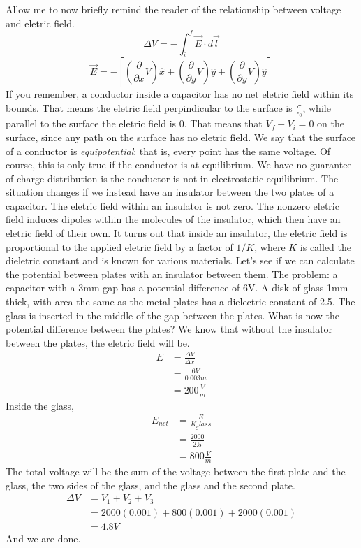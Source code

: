 \documentclass[nobib]{tufte-handout}
\begin{document}
Allow me to now briefly remind the reader of 
the relationship between voltage and eletric field. 
\[\Delta V = -\int_{i}^{f} \vec{E}\cdot d\vec{l}\]
\[\vec{E} = - \left[ \left(\frac{\partial}{\partial x}V\right)\hat{x} + \left(\frac{\partial}{\partial y}V\right)\hat{y} + \left(\frac{\partial}{\partial y}V\right)\hat{y} \right]\]
If you remember, a conductor inside a capacitor
has no net eletric field within its bounds. 
That means the eletric field perpindicular to 
the surface is $\frac{\sigma}{\epsilon_0}$, while parallel 
to the surface the eletric field is 0. 
That means that $V_f - V_i = 0$ on 
the surface, since any path on the surface has 
no eletric field. We say that the surface of 
a conductor is \emph{equipotential}; that is, 
every point has the same voltage. Of course, this 
is only true if the conductor is at equilibrium.
We have no guarantee of charge distribution is the 
conductor is not in electrostatic equilibrium. 
The situation changes if we instead have an insulator 
between the two plates of a capacitor. The eletric field 
within an insulator is not zero. The nonzero 
eletric field induces dipoles within the molecules 
of the insulator, which then have an eletric field of their own. 
It turns out that inside an insulator, the eletric field is 
proportional to the applied eletric field by a factor of $1/K$, 
where $K$ is called the dieletric constant and is known for various materials. 
Let's see if we can calculate the potential between plates with an insulator between 
them. The problem: a capacitor with a 3mm gap has a potential
difference of 6V. A disk of glass 1mm thick, with
area the same as the metal plates has a dielectric
constant of 2.5. The glass is inserted in the middle
of the gap between the plates. What is now the
potential difference between the plates? 
We know that without the insulator between the plates, the eletric 
field will be. 
\begin{align*}
    E &= \frac{\Delta V}{\Delta x} \\
    &= \frac{6V}{0.003 m} \\
    &= 200 \frac{V}{m}
\end{align*}
Inside the glass, 
\begin{align*}
    E_{net} &= \frac{E}{K_glass} \\
    &= \frac{2000}{2.5} \\
    &= 800 \frac{V}{m}
\end{align*}
The total voltage will be the sum of the voltage 
between the first plate and the glass, the two sides of 
the glass, and the glass and the second plate. 
\begin{align*}
    \Delta V &= V_1 + V_2 + V_3 \\
    &= 2000(0.001) + 800(0.001) + 2000(0.001) \\
    &= 4.8 V
\end{align*}
And we are done. 
\end{document}
